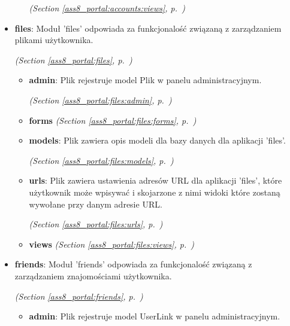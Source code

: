 \begin{itemize}
\begin{itemize}
  \textit{(Section \ref{ass8_portal:accounts:views}, p.~\pageref{ass8_portal:accounts:views})}

  \end{itemize}
\item \textbf{files}: Moduł 'files' odpowiada za funkcjonalość związaną z zarządzaniem plikami 
użytkownika.



  \textit{(Section \ref{ass8_portal:files}, p.~\pageref{ass8_portal:files})}

  \begin{itemize}
\setlength{\parskip}{0ex}
    \item \textbf{admin}: Plik rejestruje model Plik w panelu administracyjnym.



  \textit{(Section \ref{ass8_portal:files:admin}, p.~\pageref{ass8_portal:files:admin})}

    \item \textbf{forms}
  \textit{(Section \ref{ass8_portal:files:forms}, p.~\pageref{ass8_portal:files:forms})}

    \item \textbf{models}: Plik zawiera opis modeli dla bazy danych dla aplikacji 'files'.



  \textit{(Section \ref{ass8_portal:files:models}, p.~\pageref{ass8_portal:files:models})}

    \item \textbf{urls}: 
Plik zawiera ustawienia adresów URL dla aplikacji 'files', 
które użytkownik może wpisywać i skojarzone z nimi widoki które zostaną wywołane przy 
danym adresie URL. 


  \textit{(Section \ref{ass8_portal:files:urls}, p.~\pageref{ass8_portal:files:urls})}

    \item \textbf{views}
  \textit{(Section \ref{ass8_portal:files:views}, p.~\pageref{ass8_portal:files:views})}

  \end{itemize}
\item \textbf{friends}: Moduł 'friends' odpowiada za funkcjonalość związaną z zarządzaniem 
znajomościami użytkownika.



  \textit{(Section \ref{ass8_portal:friends}, p.~\pageref{ass8_portal:friends})}

  \begin{itemize}
\setlength{\parskip}{0ex}
    \item \textbf{admin}: Plik rejestruje model UserLink w panelu administracyjnym.




\end{itemize}
\end{itemize}

